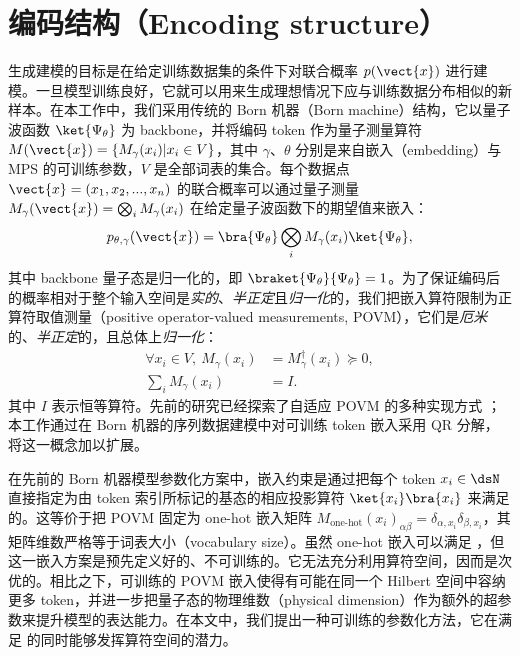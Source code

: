 \section{编码结构（Encoding structure）}

生成建模的目标是在给定训练数据集的条件下对联合概率 $p(\vect{x})$ 进行建模。一旦模型训练良好，它就可以用来生成理想情况下应与训练数据分布相似的新样本。在本工作中，我们采用传统的 Born 机器（Born machine）结构，它以量子波函数 $\ket{\Psi_\theta}$ 为 backbone，并将编码 token 作为量子测量算符 $M(\vect{x})=\{M_{\gamma}(x_i)|x_i\in V\}$，其中 $\gamma$、$\theta$ 分别是来自嵌入（embedding）与 MPS 的可训练参数，$V$ 是全部词表的集合。每个数据点 $\vect{x}=(x_1,x_2,...,x_n)$ 的联合概率可以通过量子测量 $M_\gamma(\vect{x})=\bigotimes_{i}M_{\gamma}(x_i)$ 在给定量子波函数下的期望值来嵌入：
\begin{equation}\label{eq: P}
    p_{\theta, \gamma}(\vect{x})=\bra{\Psi_\theta}\bigotimes_{i}M_{\gamma}(x_i)\ket{\Psi_\theta},
\end{equation}
其中 backbone 量子态是归一化的，即 $\braket{\Psi_\theta}{\Psi_\theta}=1$。为了保证编码后的概率相对于整个输入空间是\textit{实的}、\textit{半正定}且\textit{归一化}的，我们把嵌入算符限制为正算符取值测量（positive operator-valued measurements, POVM），它们是\textit{厄米}的、\textit{半正定}的，且总体上\textit{归一化}：
\begin{equation}\label{eq: emb}
\begin{split}
    \forall x_{i}\in V,\ M_{\gamma}(x_i)&=M^{\dagger}_{\gamma}(x_i)\succeq 0,\\
    \sum_{i}M_{\gamma}(x_i)&=I.
\end{split}
\end{equation}
其中 $I$ 表示恒等算符。先前的研究已经探索了自适应 POVM 的多种实现方式 \cite{2022arXiv220807817G, 2023arXiv230315353Z, 2021PRXQ....2d0342G}；本工作通过在 Born 机器的序列数据建模中对可训练 token 嵌入采用 QR 分解，将这一概念加以扩展。


在先前的 Born 机器模型参数化方案中，嵌入约束是通过把每个 token $x_i\in\dsN$ 直接指定为由 token 索引所标记的基态的相应投影算符 $\ket{x_i}\bra{x_i}$ 来满足的\cite{PhysRevX.8.031012}。这等价于把 POVM 固定为 one-hot 嵌入矩阵 $M_\text{one-hot}(x_i)_{\alpha\beta}=\delta_{\alpha,x_i}\delta_{\beta,x_i}$，其矩阵维数严格等于词表大小（vocabulary size）。虽然 one-hot 嵌入可以满足 ，但这一嵌入方案是预先定义好的、不可训练的。它无法充分利用算符空间，因而是次优的。相比之下，可训练的 POVM 嵌入使得有可能在同一个 Hilbert 空间中容纳更多 token，并进一步把量子态的物理维数（physical dimension）作为额外的超参数来提升模型的表达能力。在本文中，我们提出一种可训练的参数化方法，它在满足  的同时能够发挥算符空间的潜力。

